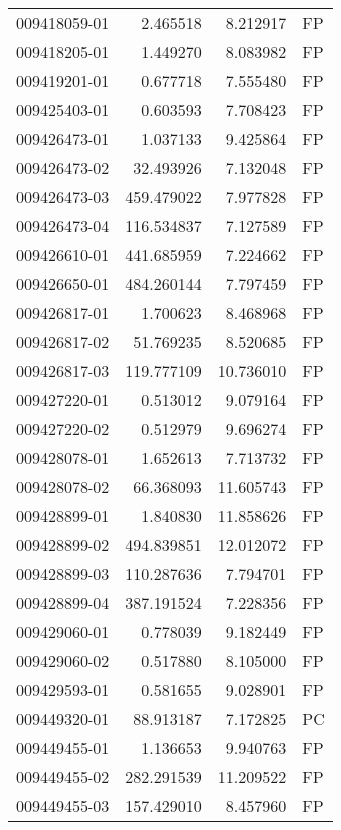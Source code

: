 \begin{tabular}{lrrl}
009418059-01 &    2.465518 &       8.212917 &   FP \\
009418205-01 &    1.449270 &       8.083982 &   FP \\
009419201-01 &    0.677718 &       7.555480 &   FP \\
009425403-01 &    0.603593 &       7.708423 &   FP \\
009426473-01 &    1.037133 &       9.425864 &   FP \\
009426473-02 &   32.493926 &       7.132048 &   FP \\
009426473-03 &  459.479022 &       7.977828 &   FP \\
009426473-04 &  116.534837 &       7.127589 &   FP \\
009426610-01 &  441.685959 &       7.224662 &   FP \\
009426650-01 &  484.260144 &       7.797459 &   FP \\
009426817-01 &    1.700623 &       8.468968 &   FP \\
009426817-02 &   51.769235 &       8.520685 &   FP \\
009426817-03 &  119.777109 &      10.736010 &   FP \\
009427220-01 &    0.513012 &       9.079164 &   FP \\
009427220-02 &    0.512979 &       9.696274 &   FP \\
009428078-01 &    1.652613 &       7.713732 &   FP \\
009428078-02 &   66.368093 &      11.605743 &   FP \\
009428899-01 &    1.840830 &      11.858626 &   FP \\
009428899-02 &  494.839851 &      12.012072 &   FP \\
009428899-03 &  110.287636 &       7.794701 &   FP \\
009428899-04 &  387.191524 &       7.228356 &   FP \\
009429060-01 &    0.778039 &       9.182449 &   FP \\
009429060-02 &    0.517880 &       8.105000 &   FP \\
009429593-01 &    0.581655 &       9.028901 &   FP \\
009449320-01 &   88.913187 &       7.172825 &   PC \\
009449455-01 &    1.136653 &       9.940763 &   FP \\
009449455-02 &  282.291539 &      11.209522 &   FP \\
009449455-03 &  157.429010 &       8.457960 &   FP \\

\end{tabular}
